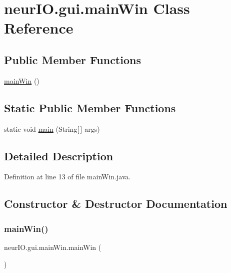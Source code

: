 \hypertarget{classneur_i_o_1_1gui_1_1main_win}{}\section{neur\+I\+O.\+gui.\+main\+Win Class Reference}
\label{classneur_i_o_1_1gui_1_1main_win}
\subsection*{Public Member Functions}
\begin{DoxyCompactItemize}
\item 
\hyperlink{classneur_i_o_1_1gui_1_1main_win_afea0b56eba10143502905975ceba7e25}{main\+Win} ()
\end{DoxyCompactItemize}
\subsection*{Static Public Member Functions}
\begin{DoxyCompactItemize}
\item 
static void \hyperlink{classneur_i_o_1_1gui_1_1main_win_a83d7ab4e35ec91fe149719b2c25cf834}{main} (String\mbox{[}$\,$\mbox{]} args)
\end{DoxyCompactItemize}


\subsection{Detailed Description}


Definition at line 13 of file main\+Win.\+java.



\subsection{Constructor \& Destructor Documentation}
\mbox{\label{classneur_i_o_1_1gui_1_1main_win_afea0b56eba10143502905975ceba7e25}} 
\subsubsection{\texorpdfstring{main\+Win()}{mainWin()}}
{\footnotesize\ttfamily neur\+I\+O.\+gui.\+main\+Win.\+main\+Win (\begin{DoxyParamCaption}{ }\end{DoxyParamCaption})}

